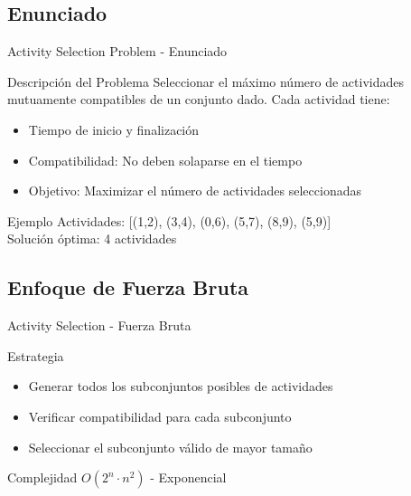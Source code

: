 \documentclass[aspectratio=169]{beamer}
\begin{document}
\subsection{Enunciado}
\begin{frame}{Activity Selection Problem - Enunciado}
\begin{block}{Descripción del Problema}
Seleccionar el máximo número de actividades mutuamente compatibles de un conjunto dado. Cada actividad tiene:
\begin{itemize}
\item Tiempo de inicio y finalización
\item Compatibilidad: No deben solaparse en el tiempo
\item Objetivo: Maximizar el número de actividades seleccionadas
\end{itemize}
\end{block}

\begin{exampleblock}{Ejemplo}
Actividades: [(1,2), (3,4), (0,6), (5,7), (8,9), (5,9)]\\
Solución óptima: 4 actividades
\end{exampleblock}
\end{frame}

\subsection{Enfoque de Fuerza Bruta}
\begin{frame}{Activity Selection - Fuerza Bruta}
\begin{block}{Estrategia}
\begin{itemize}
\item Generar todos los subconjuntos posibles de actividades
\item Verificar compatibilidad para cada subconjunto
\item Seleccionar el subconjunto válido de mayor tamaño
\end{itemize}
\end{block}

\begin{alertblock}{Complejidad}
$O(2^n \cdot n^2)$ - Exponencial
\end{alertblock}
\end{frame}
\end{document}

